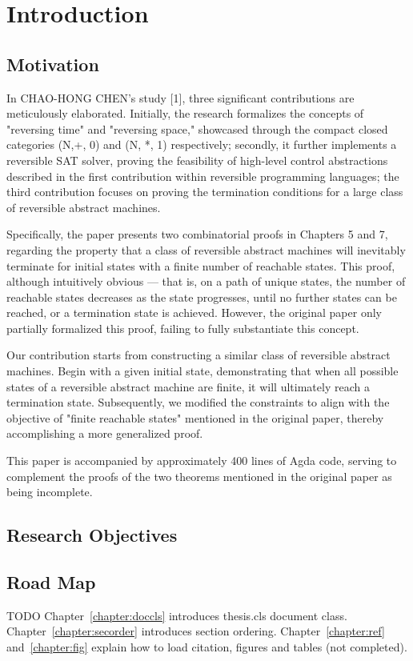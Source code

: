 \chapter{Introduction}
\label{chapter:intro}

\section{Motivation}

In CHAO-HONG CHEN's study [1], three significant contributions are meticulously elaborated. 
Initially, the research formalizes the concepts of "reversing time" and "reversing space," showcased through the compact closed categories (N,+, 0) and (N, *, 1) respectively; 
secondly, it further implements a reversible SAT solver, proving the feasibility of high-level control abstractions described in the first contribution within reversible programming languages; 
the third contribution focuses on proving the termination conditions for a large class of reversible abstract machines.

Specifically, the paper presents two combinatorial proofs in Chapters 5 and 7, regarding the property that a class of reversible abstract machines will inevitably terminate for initial states with a finite number of reachable states. 
This proof, although intuitively obvious — that is, on a path of unique states, the number of reachable states decreases as the state progresses, until no further states can be reached, or a termination state is achieved. 
However, the original paper only partially formalized this proof, failing to fully substantiate this concept.

Our contribution starts from constructing a similar class of reversible abstract machines. 
Begin with a given initial state, demonstrating that when all possible states of a reversible abstract machine are finite, it will ultimately reach a termination state.
Subsequently, we modified the constraints to align with the objective of "finite reachable states" mentioned in the original paper, thereby accomplishing a more generalized proof.

This paper is accompanied by approximately 400 lines of Agda code, serving to complement the proofs of the two theorems mentioned in the original paper as being incomplete.

\section{Research Objectives}


\section{Road Map}
TODO
Chapter~\ref{chapter:doccls} introduces thesis.cls document class.
Chapter~\ref{chapter:secorder} introduces section ordering.
Chapter~\ref{chapter:ref} and~\ref{chapter:fig} explain how to load citation, figures and tables (not completed).